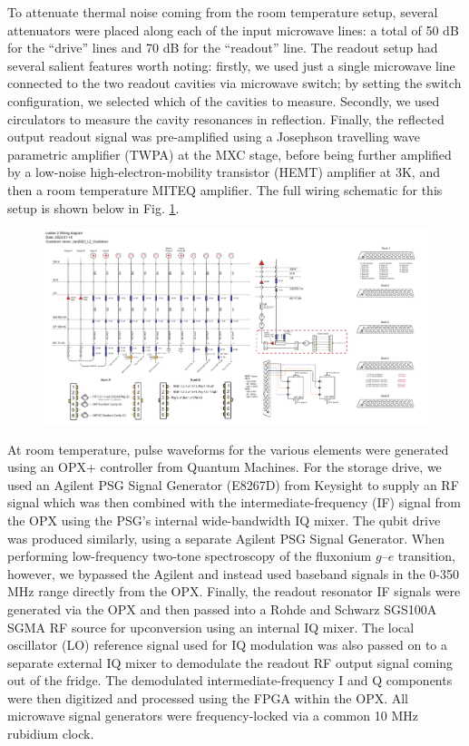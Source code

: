 To attenuate thermal noise coming from the room temperature setup, several attenuators were placed along each of the input microwave lines: a total of 50 dB for the ``drive'' lines and 70 dB for the ``readout'' line. The readout setup had several salient features worth noting: firstly, we used just a single microwave line connected to the two readout cavities via microwave switch; by setting the switch configuration, we selected which of the cavities to measure. Secondly, we used circulators to measure the cavity resonances in reflection. Finally, the reflected output readout signal was pre-amplified using a Josephson travelling wave parametric amplifier (TWPA) at the MXC stage, before being further amplified by a low-noise high-electron-mobility transistor (HEMT) amplifier at 3K, and then a room temperature MITEQ amplifier. The full wiring schematic for this setup is shown below in Fig. \ref{fig:4-microwave-wiring-diagram}. 

\begin{figure}[h]
    \centering
    \includegraphics[width=\linewidth]{Figures/4/Microwave-Wiring-Diagram.pdf}
    \caption{}
    \label{fig:4-microwave-wiring-diagram}
\end{figure}

At room temperature, pulse waveforms for the various elements were generated using an OPX+ controller from Quantum Machines. For the storage drive, we used an Agilent PSG Signal Generator (E8267D) from Keysight to supply an RF signal which was then combined with the intermediate-frequency (IF) signal from the OPX using the PSG's internal wide-bandwidth IQ mixer. The qubit drive was produced similarly, using a separate Agilent PSG Signal Generator. When performing low-frequency two-tone spectroscopy of the fluxonium $g$--$e$ transition, however, we bypassed the Agilent and instead used baseband signals in the 0-350 MHz range directly from the OPX. Finally, the readout resonator IF signals were generated via the OPX and then passed into a Rohde and Schwarz SGS100A SGMA RF source for upconversion using an internal IQ mixer. The local oscillator (LO) reference signal used for IQ modulation was also passed on to a separate external IQ mixer to demodulate the readout RF output signal coming out of the fridge. The demodulated intermediate-frequency I and Q components were then digitized and processed using the FPGA within the OPX. All microwave signal generators were frequency-locked via a common 10 MHz rubidium clock. 

